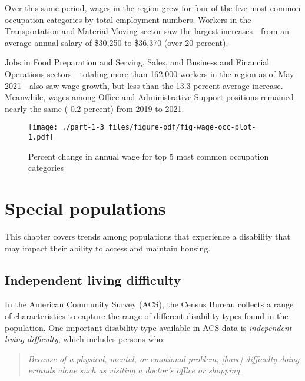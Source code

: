 \documentclass[
  letterpaper,
  DIV=11,
  numbers=noendperiod]{scrreprt}
\begin{document}
Over this same period, wages in the region grew for four of the five
most common occupation categories by total employment numbers. Workers
in the Transportation and Material Moving sector saw the largest
increases---from an average annual salary of \$30,250 to \$36,370 (over
20 percent).

Jobs in Food Preparation and Serving, Sales, and Business and Financial
Operations sectors---totaling more than 162,000 workers in the region as
of May 2021---also saw wage growth, but less than the 13.3 percent
average increase. Meanwhile, wages among Office and Administrative
Support positions remained nearly the same (-0.2 percent) from 2019 to
2021.

\begin{figure}

{\centering \texttt{[image: ./part-1-3\_files/figure-pdf/fig-wage-occ-plot-1.pdf]}

}

\caption{\label{fig-wage-occ-plot}Percent change in annual wage for top
5 most common occupation categories}

\end{figure}

\hypertarget{part-1-4}{%
\chapter{Special populations}\label{part-1-4}}

This chapter covers trends among populations that experience a
disability that may impact their ability to access and maintain housing.

\hypertarget{independent-living-difficulty}{%
\section{Independent living
difficulty}\label{independent-living-difficulty}}

In the American Community Survey (ACS), the Census Bureau collects a
range of characteristics to capture the range of different disability
types found in the population. One important disability type available
in ACS data is \emph{independent living difficulty}, which includes
persons who:

\begin{quote}
\emph{Because of a physical, mental, or emotional problem, {[}have{]}
difficulty doing errands alone such as visiting a doctor's office or
shopping.}
\end{quote}
\end{document}
